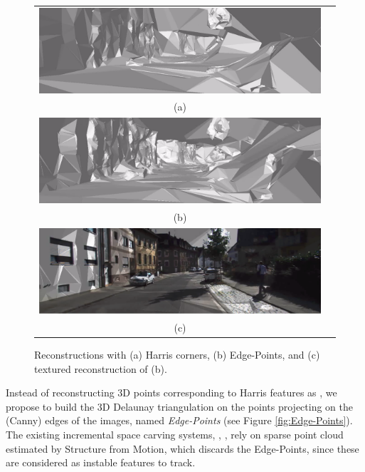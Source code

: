 \begin{figure}[tp]
\centering
\begin{tabular}{cc}
\includegraphics[width=0.92\columnwidth]{./img//reconstrHarris}\\
(a)\\
\includegraphics[width=0.92\columnwidth]{./img//reconstr}\\
(b)\\
\includegraphics[width=0.92\columnwidth]{./img//reconstrTex}\\
(c)\\
\end{tabular}
\caption{Reconstructions with (a) Harris corners, (b) Edge-Points, and (c) textured reconstruction of (b).}
\label{fig:recons}
\end{figure}


Instead of reconstructing 3D points corresponding to Harris features as \cite{litvinov_lhuillier_13}, we propose to build the 3D Delaunay triangulation on the points projecting on the (Canny) edges of the images, named \emph{Edge-Points} (see Figure \ref{fig:Edge-Points}). 
The existing incremental space carving systems, \eg, \cite{litvinov_Lhiuller14, litvinov_lhuillier_13, lovi_et_al_11}, rely on sparse point cloud estimated by Structure from Motion, which discards the Edge-Points, since these are considered as instable features to track.

